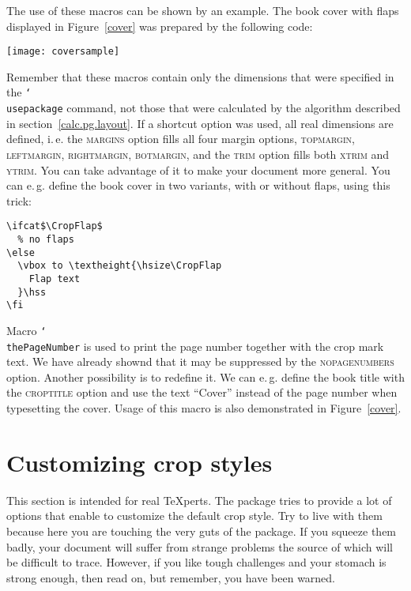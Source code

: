 \documentclass[11pt]{article}
\makeatletter
\def\mg#1{\ifvmode\leavevmode\fi\marginpar{\texttt{#1}}\ignorespaces}
\def\cmg#1{\mg{\char`\\#1}}
\def\opt#1{\texorpdfstring{\textmd{\textsc{#1}}}{#1}}
\DeclareRobustCommand\cmd[1]{\texttt{\char`\\#1}}
\def\ie.{i.\,e.\@}
\def\eg.{e.\,g.\@}
\let\zwcomma\,
\def\,{\texorpdfstring{\zwcomma}{}}
\makeatother
\begin{document}
The use of these macros can be shown by an example. The book cover with flaps displayed in
Figure~\ref{cover} was prepared by the following code:

\medskip


\begin{sidewaysfigure}[p]
\centerline{\texttt{[image: coversample]}}

\caption{Sample of a book cover with flaps}\label{cover}
\end{sidewaysfigure}

Remember that these macros contain only the dimensions that were specified in the \cmd{usepackage}
command, not those that were calculated by the algorithm described in section~\ref{calc.pg.layout}.
If a shortcut option was used, all real dimensions are defined, \ie. the \opt{margins} option fills
all four margin options, \opt{topmargin}, \opt{leftmargin}, \opt{rightmargin}, \opt{botmargin}, and
the \opt{trim} option fills both \opt{xtrim} and \opt{ytrim}. You can take advantage of it to make
your document more general. You can \eg. define the book cover in two variants, with or without
flaps, using this trick:

\medskip
\begin{verbatim}
\ifcat$\CropFlap$
  % no flaps
\else
  \vbox to \textheight{\hsize\CropFlap
    Flap text
  }\hss
\fi
\end{verbatim}

\medskip

\cmg{thePageNumber}
Macro \cmd{thePageNumber} is used to print the page number together with the crop mark text. We have
already shownd that it may be suppressed by the \opt{nopagenumbers} option. Another possibility is
to redefine it. We can \eg. define the book title with the \opt{croptitle} option and use the
text ``Cover'' instead of the page number when typesetting the cover. Usage of this macro is also
demonstrated in Figure~\ref{cover}.

\section{Customizing crop styles}
This section is intended for real \TeX perts. The package tries to provide a lot of options that
enable to customize the default crop style. Try to live with them because here you are touching the
very guts of the package. If you squeeze them badly, your document will suffer from strange
problems the source of which will be difficult to trace. However, if you like tough challenges and
your stomach is strong enough, then read on, but remember, you have been warned.
\end{document}
